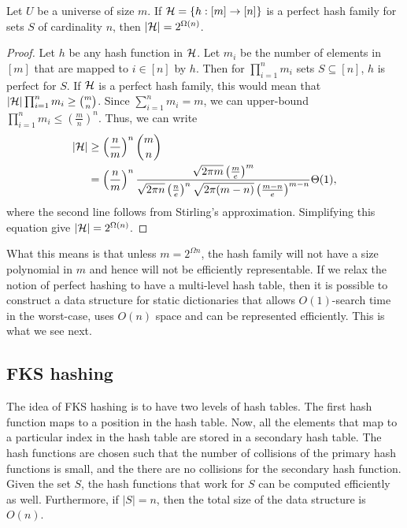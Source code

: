 \begin{lemma}
  Let $U$ be a universe of size $m$. If ${\cal H} = \{h:[m] \to [n] \}$ is a
  perfect hash family for sets $S$ of cardinality $n$, then
  $|{\cal H}| = 2^{\Omega(n)}$.
  \label{lem:ph-lb}
\end{lemma}
\begin{proof}
  Let $h$ be any hash function in ${\cal H}$. Let $m_i$ be the number of
  elements in $[m]$ that are mapped to $i\in [n]$ by $h$. Then for
  $\prod_{i=1}^n m_i$ sets $S\subseteq [n]$, $h$ is perfect for $S$. If
  ${\cal H}$ is a perfect hash family, this would mean that
  $|{\cal H}| \prod_{i=1}^n m_i \geq \binom{m}{n}$. Since
  $\sum_{i=1}^n m_i = m$, we can upper-bound
  $\prod_{i=1}^n m_i \leq \left( \frac{m}{n} \right)^n$. Thus, we can write
  \begin{align*}
    |{\cal H}| &\geq \left(\frac{n}{m} \right)^n \binom{m}{n} \\
    &= \left(\frac{n}{m} \right)^n \frac{\sqrt{2\pi m}\left(\frac{m}{e}\right)^m}{\sqrt{2\pi n} \left( \frac{n}{e} \right)^n \sqrt{2\pi(m-n)} \left( \frac{m-n}{e} \right)^{m-n}} \Theta(1),
  \end{align*}
  where the second line follows from Stirling's approximation. Simplifying this
  equation give $|{\cal H}| = 2^{\Omega(n)}$.
\end{proof}

What this means is that unless $m = 2^{\Omega{n}}$, the hash family will not
have a size polynomial in $m$ and hence will not be efficiently representable.
If we relax the notion of perfect hashing to have a multi-level hash table, then
it is possible to construct a data structure for static dictionaries that allows
$O(1)$-search time in the worst-case, uses $O(n)$ space and can be represented
efficiently. This is what we see next.

\subsection{FKS hashing} 

The idea of FKS hashing is to have two levels of hash tables. The first hash
function maps to a position in the hash table. Now, all the elements that map to
a particular index in the hash table are stored in a secondary hash table. The
hash functions are chosen such that the number of collisions of the primary hash
functions is small, and the there are no collisions for the secondary hash
function. Given the set $S$, the hash functions that work for $S$ can be
computed efficiently as well. Furthermore, if $|S|=n$, then the total size of
the data structure is $O(n)$.

